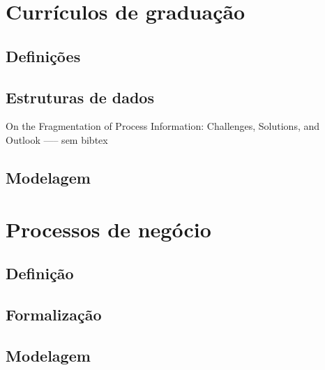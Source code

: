 \documentclass[a4paper]{article}
\begin{document}
\lipsum[14]
\lipsum[17]
\lipsum[80]

\section{Currículos de graduação}
\lipsum[10]
\lipsum[10]

\subsection{Definições}
\lipsum[10]
\lipsum[10]
\lipsum[10]
\lipsum[10]

\subsection{Estruturas de dados}

On the Fragmentation of Process Information: Challenges, Solutions, and Outlook ----- sem bibtex 
\lipsum[10]
\lipsum[10]
\lipsum[10]
\lipsum[10]
\lipsum[10]
\lipsum[10]
\lipsum[10]

\subsection{Modelagem}

\lipsum[10]
\lipsum[10]
\lipsum[10]
\lipsum[10]
\lipsum[10]
\lipsum[10]
\lipsum[10]

\section{Processos de negócio}

\cite{BPM_CBOK}
\lipsum[10]
\lipsum[10]
\lipsum[10]
\lipsum[10]
\lipsum[10]
\lipsum[10]

\subsection{Definição}

\lipsum[10]
\lipsum[10]
\lipsum[10]
\lipsum[10]
\lipsum[10]
\lipsum[10]

\subsection{Formalização}

\cite{PM_form}
\lipsum[10]
\lipsum[10]
\lipsum[10]
\lipsum[10]
\lipsum[10]
\lipsum[10]

\subsection{Modelagem}
\end{document}
